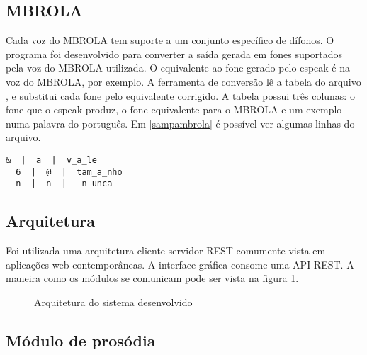 \subsection{MBROLA}
Cada voz do MBROLA tem suporte a um conjunto específico de dífonos. O programa
 foi desenvolvido para converter a saída gerada em fones
suportados pela voz do MBROLA utilizada. O equivalente ao fone \code{&} gerado
pelo espeak é  na voz do MBROLA, por exemplo. A ferramenta de conversão
lê a tabela do arquivo , e substitui cada fone pelo
equivalente corrigido. A tabela possui três colunas: o fone que o espeak
produz, o fone equivalente para o MBROLA e um exemplo numa palavra do português.
Em \ref{sampambrola} é possível ver algumas linhas do arquivo.

\begin{lstlisting}[caption=Linhas da tabela de conversão, label=sampambrola]
  &  |  a  |  v_a_le
  6  |  @  |  tam_a_nho
  n  |  n  |  _n_unca
\end{lstlisting}

\subsection{Arquitetura}
Foi utilizada uma arquitetura cliente-servidor REST \cite{rest} comumente vista em aplicações web contemporâneas. A interface gráfica consome uma API REST. A maneira como os
módulos se comunicam pode ser vista na figura \ref{fig:arch}.

\begin{figure}[!htbp]
\centering
{}
\caption{Arquitetura do sistema desenvolvido}
\label{fig:arch}
\end{figure}

\subsection{Módulo de prosódia}

